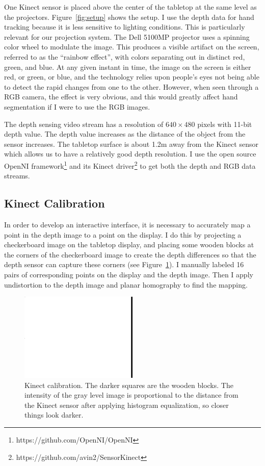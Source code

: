 One Kinect sensor is placed above the center of the tabletop
at the same level as the projectors. Figure~\ref{fig:setup} shows the setup.
I use the depth data for hand tracking because it is
less sensitive to lighting conditions. This is particularly relevant for our
projection system. The Dell 5100MP projector uses a spinning color wheel to
modulate the image. This produces a visible artifact on the screen, referred to 
as the ``rainbow effect'', with colors separating out in distinct red, green, 
and blue. At any given instant in time, the image on the screen is either red, or green, or blue,
and the technology relies upon people's eyes not being able to detect the rapid 
changes from one to the other. However, when seen through a RGB camera, the
effect is very obvious, and this would greatly affect hand segmentation if I
were to use the RGB images. 

The depth sensing video
stream has a resolution of $640\times 480$ pixels with 11-bit depth value. The
depth value increases as the distance of the object from the sensor increases.
The tabletop surface is about 1.2m away from the Kinect
sensor which allows us to have a relatively good depth resolution. I use the
open source OpenNI framework\footnote{https://github.com/OpenNI/OpenNI} and its
Kinect driver\footnote{https://github.com/avin2/SensorKinect} to get both the depth and RGB data streams.

\subsection{Kinect Calibration}
In order to develop an interactive interface, it is necessary to accurately map
a point in the depth image to a point on the display. I do this by projecting
a checkerboard image on the tabletop display, and placing some wooden blocks at
the corners of the checkerboard image to create the depth differences so that 
the depth sensor can capture these corners (see Figure~\ref{fig:calibration}).
I manually labeled 16 pairs of corresponding points on the display and the depth
image. Then I apply undistortion to the depth image and planar homography to find the mapping.

\begin{figure}[tbh]
  \centering
  \includegraphics[width=0.5\textwidth]{figures/calibration.png} 
  \caption{Kinect calibration. The darker squares are the wooden blocks. The
  intensity of the gray level image is proportional to the distance
  from the Kinect sensor after applying histogram
  equalization,
  so closer things look darker.
  }
  \label{fig:calibration}
\end{figure}

